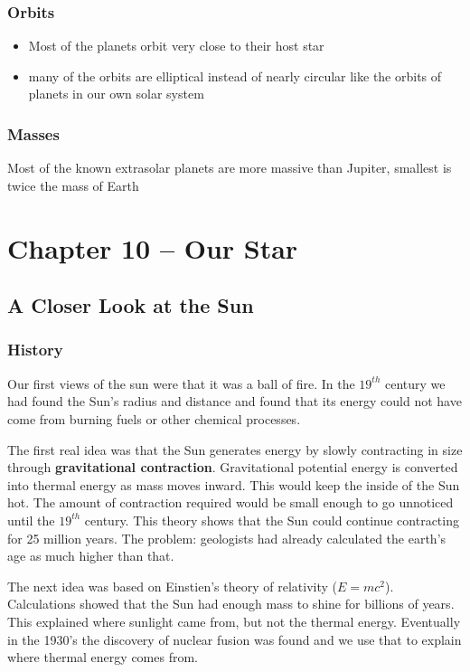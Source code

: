 \documentclass[12pt]{article}
\begin{document}
\subsubsection*{Orbits}
\begin{itemize}
\item Most of the planets orbit very close to their host star
\item many of the orbits are elliptical instead of nearly circular like the orbits of planets in our own solar system
\end{itemize}

\subsubsection*{Masses}
Most of the known extrasolar planets are more massive than Jupiter, smallest is twice the mass of Earth

\section{Chapter 10 -- Our Star}
\subsection{A Closer Look at the Sun}
\subsubsection{History}
Our first views of the sun were that it was a ball of fire. In the $19^{th}$ century we had found the Sun's radius and distance and found that its energy could not have come from burning fuels or other chemical processes.

The first real idea was that the Sun generates energy by slowly contracting in size through \textbf{gravitational contraction}. Gravitational potential energy is converted into thermal energy as mass moves inward. This would keep the inside of the Sun hot. The amount of contraction required would be small enough to go unnoticed until the $19^{th}$ century. This theory shows that the Sun could continue contracting for 25 million years. The problem: geologists had already calculated the earth's age as much higher than that.

The next idea was based on Einstien's theory of relativity ($E=mc^2$). Calculations showed that the Sun had enough mass to shine for billions of years. This explained where sunlight came from, but not the thermal energy. Eventually in the  1930's the discovery of nuclear fusion was found and we use that to explain where thermal energy comes from.
\end{document}
